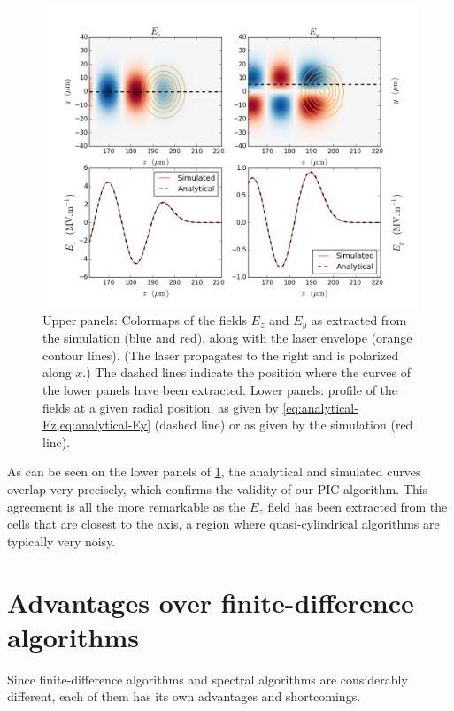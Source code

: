 \documentclass[1p,times]{elsarticle}
\begin{document}
\begin{figure}[!h]
\centering
\includegraphics[width=\textwidth]{Linear_wkfld.png}
\caption{\label{fig:Linear_wkfld}Upper panels: Colormaps of the fields $E_z$ and
  $E_y$ as extracted from the simulation (blue and red), along with
  the laser envelope (orange contour lines). (The laser propagates to the
  right and is polarized along $x$.) The dashed lines indicate the
  position where the curves of the lower panels have been extracted. 
Lower panels: profile of the fields at a given radial
position, as given by \cref{eq:analytical-Ez,eq:analytical-Ey} (dashed
line) or as given by the simulation (red line).}
\end{figure}

As can be seen on the lower panels of \cref{fig:Linear_wkfld}, the
analytical and simulated curves overlap very precisely, which confirms
the validity of our PIC algorithm. This agreement is all
the more remarkable as the $E_z$ field has been extracted from the cells
that are closest to the axis, a region where quasi-cylindrical algorithms
are typically very noisy.

\section{Advantages over finite-difference algorithms}
\label{sec:advantages}

Since finite-difference algorithms and spectral algorithms are
considerably different, each of them has its own advantages and
shortcomings. 
\end{document}
